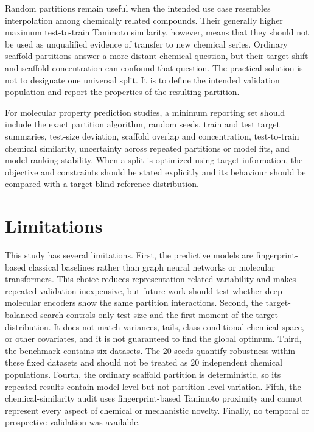 Random partitions remain useful when the intended use case resembles interpolation among chemically related compounds. Their generally higher maximum test-to-train Tanimoto similarity, however, means that they should not be used as unqualified evidence of transfer to new chemical series. Ordinary scaffold partitions answer a more distant chemical question, but their target shift and scaffold concentration can confound that question. The practical solution is not to designate one universal split. It is to define the intended validation population and report the properties of the resulting partition.

For molecular property prediction studies, a minimum reporting set should include the exact partition algorithm, random seeds, train and test target summaries, test-size deviation, scaffold overlap and concentration, test-to-train chemical similarity, uncertainty across repeated partitions or model fits, and model-ranking stability. When a split is optimized using target information, the objective and constraints should be stated explicitly and its behaviour should be compared with a target-blind reference distribution.

\section{Limitations}

This study has several limitations. First, the predictive models are fingerprint-based classical baselines rather than graph neural networks or molecular transformers. This choice reduces representation-related variability and makes repeated validation inexpensive, but future work should test whether deep molecular encoders show the same partition interactions. Second, the target-balanced search controls only test size and the first moment of the target distribution. It does not match variances, tails, class-conditional chemical space, or other covariates, and it is not guaranteed to find the global optimum. Third, the benchmark contains six datasets. The 20 seeds quantify robustness within these fixed datasets and should not be treated as 20 independent chemical populations. Fourth, the ordinary scaffold partition is deterministic, so its repeated results contain model-level but not partition-level variation. Fifth, the chemical-similarity audit uses fingerprint-based Tanimoto proximity and cannot represent every aspect of chemical or mechanistic novelty. Finally, no temporal or prospective validation was available.

